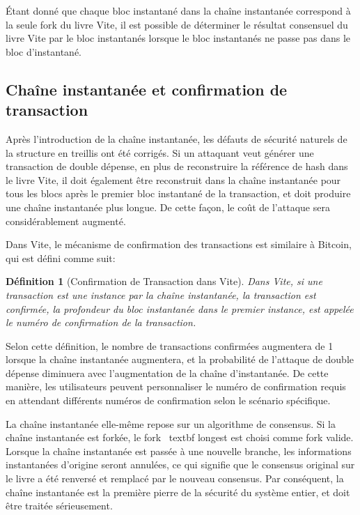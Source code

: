 \documentclass[UTF8,nofonts]{article}
\newtheorem{definition}{Définition}[section]
\begin{document}
\begin{multicols}{2}
Étant donné que chaque bloc instantané dans la chaîne instantanée correspond à la seule fork du livre Vite, il est possible de déterminer le résultat consensuel du livre Vite par le bloc instantanés lorsque le bloc instantanés ne passe pas dans le bloc d'instantané.

\subsection{Chaîne instantanée et confirmation de transaction}

Après l'introduction de la chaîne instantanée, les défauts de sécurité naturels de la structure en treillis ont été corrigés. Si un attaquant veut générer une transaction de double dépense, en plus de reconstruire la référence de hash dans le livre Vite, il doit également être reconstruit dans la chaîne instantanée pour tous les blocs après le premier bloc instantané de la transaction, et doit produire une chaîne instantanée plus longue. De cette façon, le coût de l'attaque sera considérablement augmenté.

Dans Vite, le mécanisme de confirmation des transactions est similaire à Bitcoin, qui est défini comme suit:

\begin{definition}[Confirmation de Transaction dans Vite]
Dans Vite, si une transaction est une instance par la chaîne instantanée, la transaction est confirmée, la profondeur du bloc instantanée dans le premier instance, est appelée le numéro de confirmation de la transaction.
\end{definition}

Selon cette définition, le nombre de transactions confirmées augmentera de 1 lorsque la chaîne instantanée augmentera, et la probabilité de l'attaque de double dépense diminuera avec l'augmentation de la chaîne d'instantanée. De cette manière, les utilisateurs peuvent personnaliser le numéro de confirmation requis en attendant différents numéros de confirmation selon le scénario spécifique.

La chaîne instantanée elle-même repose sur un algorithme de consensus. Si la chaîne instantanée est forkée, le fork \ textbf {longest} est choisi comme fork valide. Lorsque la chaîne instantanée est passée à une nouvelle branche, les informations instantanées d'origine seront annulées, ce qui signifie que le consensus original sur le livre a été renversé et remplacé par le nouveau consensus. Par conséquent, la chaîne instantanée est la première pierre de la sécurité du système entier, et doit être traitée sérieusement.


\end{multicols}
\end{document}
